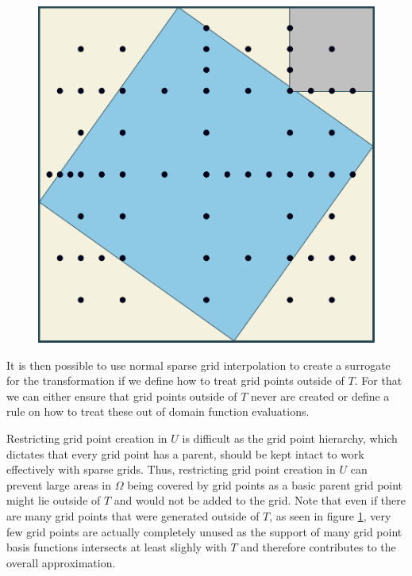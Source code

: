 \documentclass[
  a4paper,  %
  twoside,  %
  bibliography=totoc,
  headsepline,
  cleardoublepage=empty,
  parskip=half,
  draft=false
]{scrbook}
\begin{document}
\begin{mdframed}[style=style]
\begin{figure}[H]
        \centering
\begin{minipage}{.49\textwidth}
        \centering
\label{fig:aligned_grid}
    \end{minipage}%
    \begin{minipage}{0.49\textwidth}
        \centering
   \includegraphics[width=0.8\linewidth]{graphics/aligned_grid}
   \vspace{2mm}
    \end{minipage}
\end{figure}
\end{mdframed}
%
It is then possible to use normal sparse grid interpolation to create a surrogate for the transformation if we define how to treat grid points outside of $T$.
For that we can either ensure that grid points outside of $T$ never are created or define a rule on how to treat these out of domain function evaluations.

Restricting grid point creation in $U$ is difficult as the grid point hierarchy, which dictates that every grid point has a parent, should be kept intact to work effectively with sparse grids.
Thus, restricting grid point creation in $U$ can prevent large areas in $\Omega$ being covered by grid points as a basic parent grid point might lie outside of $T$ and would not be added to the grid.
Note that even if there are many grid points that were generated outside of $T$, as seen in figure \cref{fig:aligned_grid}, very few grid points are actually completely unused as the support of many grid point basis functions intersects at least slighly with $T$ and therefore contributes to the overall approximation.
\end{document}

